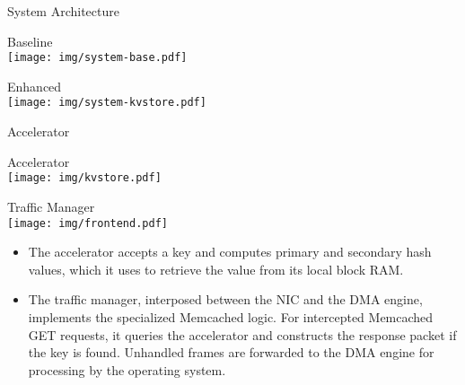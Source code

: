 \begin{block}{System Architecture}
\begin{multicols}{2}
\centering
\alert{Baseline} \\[0.5\baselineskip]
\texttt{[image: img/system-base.pdf]}

\columnbreak

\centering
\alert{Enhanced} \\[0.5\baselineskip]
\texttt{[image: img/system-kvstore.pdf]}
\end{multicols}
\end{block}

\vspace{1ex}

\begin{block}{Accelerator}
\footnotesize

\begin{multicols}{2}
\begin{center}
    \alert{Accelerator} \\[0.5\baselineskip]
    \texttt{[image: img/kvstore.pdf]}
\end{center}

\columnbreak

\begin{center}
    \alert{Traffic Manager} \\[0.5\baselineskip]
    \texttt{[image: img/frontend.pdf]}
\end{center}

\end{multicols}

\begin{itemize}
    \item The accelerator accepts a key and computes primary and secondary
        hash values, which it uses to retrieve the value from its local
        block RAM.
    \item The traffic manager, interposed between the NIC and the DMA
        engine, implements the specialized Memcached logic.
	For intercepted Memcached GET requests, it queries the
	accelerator and constructs the response packet if the key is found.
	Unhandled frames are forwarded to the DMA engine for processing
	by the operating system.
\end{itemize}
\end{block}

\vspace{1ex}

